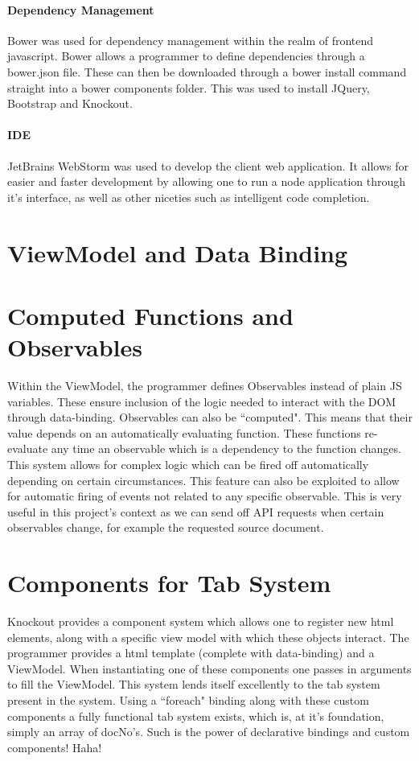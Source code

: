 \documentclass{l4proj}
\begin{document}
\paragraph{Dependency Management}
Bower was used for dependency management within the realm of frontend javascript. Bower allows a programmer to define dependencies through a bower.json file. These can then be downloaded through a bower install command straight into a bower components folder. This was used to install JQuery, Bootstrap and Knockout.

\paragraph{IDE}
JetBrains WebStorm was used to develop the client web application. It allows for easier and faster development by allowing one to run a node application through it's interface, as well as other niceties such as intelligent code completion.

\section{ViewModel and Data Binding}

\section{Computed Functions and Observables}
Within the ViewModel, the programmer defines Observables instead of plain JS variables. These ensure inclusion of the logic needed to interact with the DOM through data-binding. Observables can also be ``computed". This means that their value depends on an automatically evaluating function. These functions re-evaluate any time an observable which is a dependency to the function changes. This system allows for complex logic which can be fired off automatically depending on certain circumstances.
This feature can also be exploited to allow for automatic firing of events not related to any specific observable. This is very useful in this project's context as we can send off API requests when certain observables change, for example the requested source document.

\section{Components for Tab System}
Knockout provides a component system which allows one to register new html elements, along with a specific view model with which these objects interact. The programmer provides a html template (complete with data-binding) and a ViewModel. When instantiating one of these components one passes in arguments to fill the ViewModel.
This system lends itself excellently to the tab system present in the system. Using a ``foreach" binding along with these custom components a fully functional tab system exists, which is, at it's foundation, simply an array of docNo's. Such is the power of declarative bindings and custom components! Haha!
\end{document}
